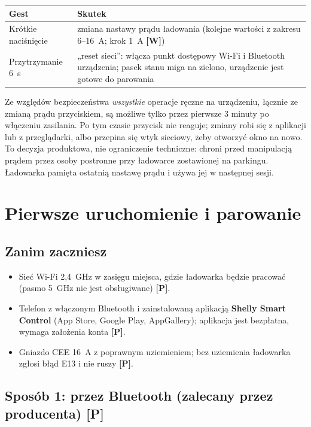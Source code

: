 \documentclass[11pt,a4paper]{article}
\newcommand{\tagP}{\textcolor{apgreen}{\textbf{[P]}}}
\newcommand{\tagW}{\textcolor{apamber}{\textbf{[W]}}}
\begin{document}
\begin{tabularx}{\textwidth}{p{4.2cm}X}
\toprule
\textbf{Gest} & \textbf{Skutek} \\
\midrule
Krótkie naciśnięcie & zmiana nastawy prądu ładowania (kolejne wartości z zakresu 6–16~A; krok 1~A \tagW) \\
Przytrzymanie 6~s & „reset sieci”: włącza punkt dostępowy Wi-Fi i Bluetooth urządzenia; pasek stanu miga na zielono, urządzenie jest gotowe do parowania \\
\bottomrule
\end{tabularx}

\begin{uwaga}
Ze względów bezpieczeństwa \emph{wszystkie} operacje ręczne na urządzeniu, łącznie ze zmianą prądu przyciskiem, są możliwe tylko przez pierwsze 3 minuty po włączeniu zasilania. Po tym czasie przycisk nie reaguje; zmiany robi się z aplikacji lub z przeglądarki, albo przepina się wtyk sieciowy, żeby otworzyć okno na nowo. To decyzja produktowa, nie ograniczenie techniczne: chroni przed manipulacją prądem przez osoby postronne przy ładowarce zostawionej na parkingu. Ładowarka pamięta ostatnią nastawę prądu i używa jej w następnej sesji.
\end{uwaga}

\section{Pierwsze uruchomienie i parowanie}

\subsection{Zanim zaczniesz}

\begin{itemize}
\item Sieć Wi-Fi 2,4~GHz w zasięgu miejsca, gdzie ładowarka będzie pracować (pasmo 5~GHz nie jest obsługiwane) \tagP.
\item Telefon z włączonym Bluetooth i zainstalowaną aplikacją \textbf{Shelly Smart Control} (App Store, Google Play, AppGallery); aplikacja jest bezpłatna, wymaga założenia konta \tagP.
\item Gniazdo CEE 16~A z poprawnym uziemieniem; bez uziemienia ładowarka zgłosi błąd E13 i nie ruszy \tagP.
\end{itemize}

\subsection{Sposób 1: przez Bluetooth (zalecany przez producenta) \tagP}
\end{document}
